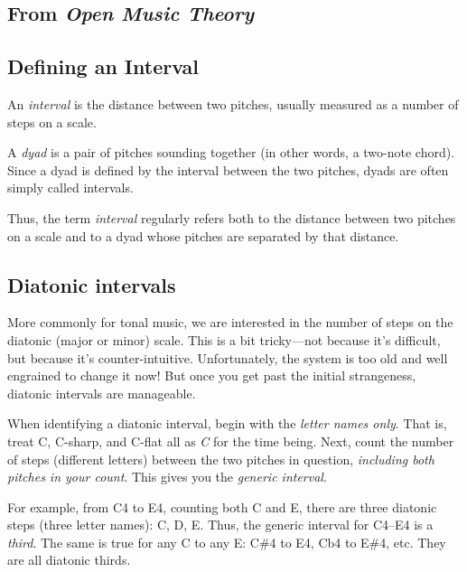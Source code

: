 \documentclass{book}
\begin{document}
\hypertarget{from-open-music-theory-24}{%
\subsection{\texorpdfstring{From \emph{Open Music
Theory}}{From Open Music Theory}}\label{from-open-music-theory-24}}

\hypertarget{defining-an-interval}{%
\subsection{Defining an Interval}\label{defining-an-interval}}

An \emph{interval} is the distance between two pitches, usually measured as a
number of steps on a scale.

A \emph{dyad} is a pair of pitches sounding together (in other words, a
two-note chord). Since a dyad is defined by the interval between the two
pitches, dyads are often simply called intervals.

Thus, the term \emph{interval} regularly refers both to the distance between
two pitches on a scale and to a dyad whose pitches are separated by that
distance.

\hypertarget{diatonic-intervals}{%
\subsection{Diatonic intervals}\label{diatonic-intervals}}

More commonly for tonal music, we are interested in the number of steps on the
diatonic (major or minor) scale. This is a bit tricky---not because it's
difficult, but because it's counter-intuitive. Unfortunately, the system is
too old and well engrained to change it now! But once you get past the initial
strangeness, diatonic intervals are manageable.

When identifying a diatonic interval, begin with the \emph{letter names only}.
That is, treat C, C-sharp, and C-flat all as \emph{C} for the time being.
Next, count the number of steps (different letters) between the two pitches in
question, \emph{including both pitches in your count}. This gives you the
\emph{generic interval}.

For example, from C4 to E4, counting both C and E, there are three diatonic
steps (three letter names): C, D, E. Thus, the generic interval for C4--E4 is
a \emph{third}. The same is true for any C to any E: C\#4 to E4, Cb4 to E\#4,
etc. They are all diatonic thirds.
\end{document}
